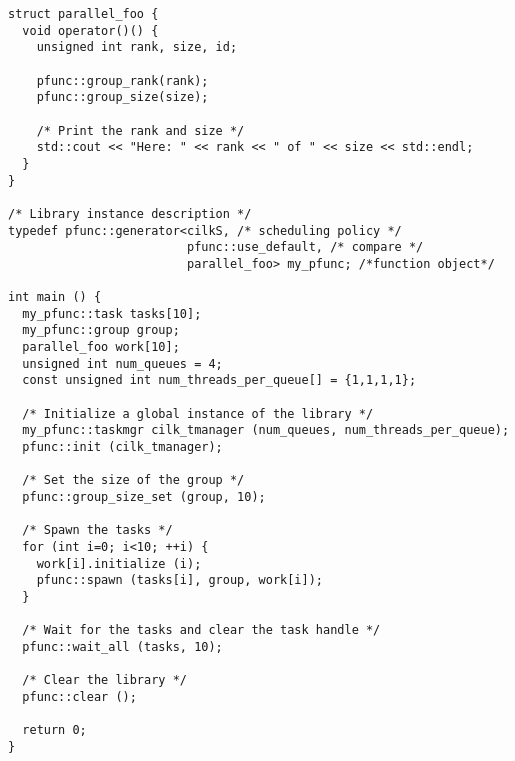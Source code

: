 \begin{lstlisting}
struct parallel_foo {
  void operator()() {
    unsigned int rank, size, id;

    pfunc::group_rank(rank);
    pfunc::group_size(size);

    /* Print the rank and size */
    std::cout << "Here: " << rank << " of " << size << std::endl;
  }
}

/* Library instance description */
typedef pfunc::generator<cilkS, /* scheduling policy */
                         pfunc::use_default, /* compare */
                         parallel_foo> my_pfunc; /*function object*/

int main () {
  my_pfunc::task tasks[10];
  my_pfunc::group group;
  parallel_foo work[10];
  unsigned int num_queues = 4;
  const unsigned int num_threads_per_queue[] = {1,1,1,1};

  /* Initialize a global instance of the library */
  my_pfunc::taskmgr cilk_tmanager (num_queues, num_threads_per_queue);
  pfunc::init (cilk_tmanager);

  /* Set the size of the group */
  pfunc::group_size_set (group, 10);

  /* Spawn the tasks */
  for (int i=0; i<10; ++i) {
    work[i].initialize (i);
    pfunc::spawn (tasks[i], group, work[i]);
  }

  /* Wait for the tasks and clear the task handle */
  pfunc::wait_all (tasks, 10);

  /* Clear the library */
  pfunc::clear ();

  return 0;
}
\end{lstlisting}
